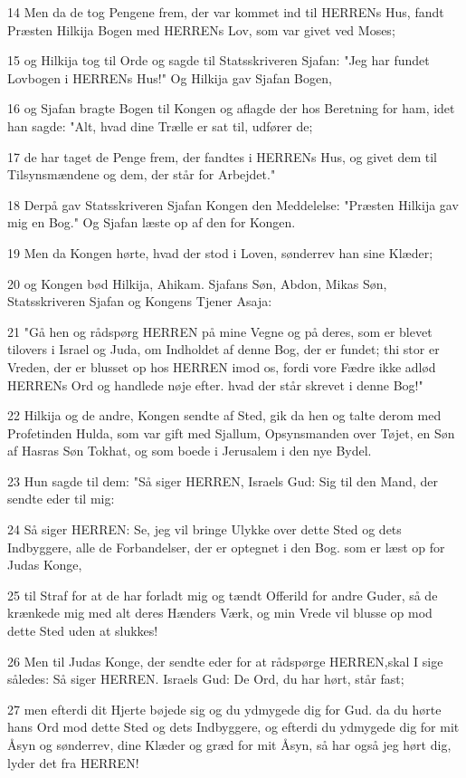 \par 14 Men da de tog Pengene frem, der var kommet ind til HERRENs Hus, fandt Præsten Hilkija Bogen med HERRENs Lov, som var givet ved Moses;
\par 15 og Hilkija tog til Orde og sagde til Statsskriveren Sjafan: "Jeg har fundet Lovbogen i HERRENs Hus!" Og Hilkija gav Sjafan Bogen,
\par 16 og Sjafan bragte Bogen til Kongen og aflagde der hos Beretning for ham, idet han sagde: "Alt, hvad dine Trælle er sat til, udfører de;
\par 17 de har taget de Penge frem, der fandtes i HERRENs Hus, og givet dem til Tilsynsmændene og dem, der står for Arbejdet."
\par 18 Derpå gav Statsskriveren Sjafan Kongen den Meddelelse: "Præsten Hilkija gav mig en Bog." Og Sjafan læste op af den for Kongen.
\par 19 Men da Kongen hørte, hvad der stod i Loven, sønderrev han sine Klæder;
\par 20 og Kongen bød Hilkija, Ahikam. Sjafans Søn, Abdon, Mikas Søn, Statsskriveren Sjafan og Kongens Tjener Asaja:
\par 21 "Gå hen og rådspørg HERREN på mine Vegne og på deres, som er blevet tilovers i Israel og Juda, om Indholdet af denne Bog, der er fundet; thi stor er Vreden, der er blusset op hos HERREN imod os, fordi vore Fædre ikke adlød HERRENs Ord og handlede nøje efter. hvad der står skrevet i denne Bog!"
\par 22 Hilkija og de andre, Kongen sendte af Sted, gik da hen og talte derom med Profetinden Hulda, som var gift med Sjallum, Opsynsmanden over Tøjet, en Søn af Hasras Søn Tokhat, og som boede i Jerusalem i den nye Bydel.
\par 23 Hun sagde til dem: "Så siger HERREN, Israels Gud: Sig til den Mand, der sendte eder til mig:
\par 24 Så siger HERREN: Se, jeg vil bringe Ulykke over dette Sted og dets Indbyggere, alle de Forbandelser, der er optegnet i den Bog. som er læst op for Judas Konge,
\par 25 til Straf for at de har forladt mig og tændt Offerild for andre Guder, så de krænkede mig med alt deres Hænders Værk, og min Vrede vil blusse op mod dette Sted uden at slukkes!
\par 26 Men til Judas Konge, der sendte eder for at rådspørge HERREN,skal I sige således: Så siger HERREN. Israels Gud: De Ord, du har hørt, står fast;
\par 27 men efterdi dit Hjerte bøjede sig og du ydmygede dig for Gud. da du hørte hans Ord mod dette Sted og dets Indbyggere, og efterdi du ydmygede dig for mit Åsyn og sønderrev, dine Klæder og græd for mit Åsyn, så har også jeg hørt dig, lyder det fra HERREN!
